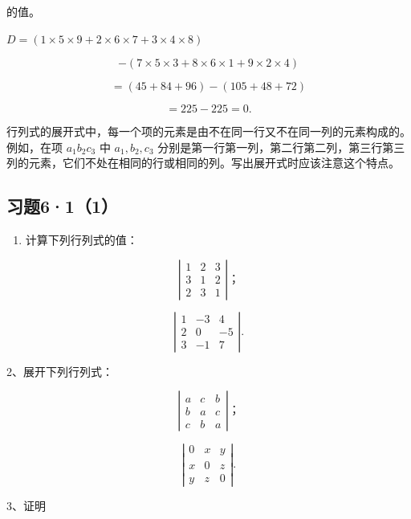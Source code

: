 的值。

\(D = (1 \times 5 \times 9 + 2 \times 6 \times 7 + 3 \times 4 \times 8)\)

\[
- (7 \times 5 \times 3 + 8 \times 6 \times 1 + 9 \times 2 \times 4)
\]

\[
= (45 + 84 + 96) - (105 + 48 + 72)
\]

\[
= 225 - 225 = 0.
\]

行列式的展开式中，每一个项的元素是由不在同一行又不在同一列的元素构成的。例如，在项
\(a_1b_2c_3\) 中 \(a_1, b_2, c_3\)
分别是第一行第一列，第二行第二列，第三行第三列的元素，它们不处在相同的行或相同的列。写出展开式时应该注意这个特点。

\subsection{习题6·1（1）}

\begin{enumerate}
\item
  计算下列行列式的值：
\end{enumerate}

\[
\left| \begin{array}{ccc} 1 & 2 & 3 \\ 3 & 1 & 2 \\ 2 & 3 & 1 \end{array} \right|\text{；} \tag {1}
\]

\[
\left| \begin{array}{ccc} 1 & - 3 & 4 \\ 2 & 0 & - 5 \\ 3 & - 1 & 7 \end{array} \right|. \tag {2}
\]

2、展开下列行列式：

\[
\left| \begin{array}{ccc} a & c & b \\ b & a & c \\ c & b & a \end{array} \right|\text{；} \tag {1}
\]

\[
\left| \begin{array}{ccc} 0 & x & y \\ x & 0 & z \\ y & z & 0 \end{array} \right|. \tag {2}
\]

3、证明

